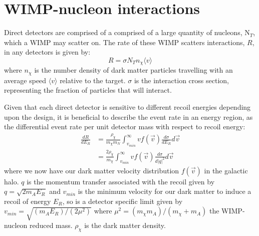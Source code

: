 \section{WIMP-nucleon interactions} \label{sec:wimp_nucleus_interactions}
\iffalse
\par
As WIMPs travel at relative non-relativistic speeds, the recoil energy of the nucleon resulting from an elastic scatter is by only the centre of mass scattering angle, $\theta$ \cite{direct_detection_of_wimps_ref}:
\begin{equation}
    E_{R} = \frac{{\mu}_{N}^{2}\nu_{\chi}^2}{m_{N}}(1-\cos(\theta))
\end{equation}
\fi
Direct detectors are comprised of a comprised of a large quantity of nucleons, N$_T$, which a WIMP may scatter on.
The rate of these WIMP scatters interactions, $R$, in any detectors is given by:
\begin{equation}
    R = \sigma N_{T} n_{\chi} \langle v \rangle
    \label{eq:wimp_nucleon_rate}
\end{equation}
where $n_\chi$ is the number density of dark matter particles travelling with an average speed $\langle v \rangle$ relative to the target.
$\sigma$ is the interaction cross section, representing the fraction of particles that will interact.
\par
Given that each direct detector is sensitive to different recoil energies depending upon the design, it is beneficial to describe the event rate in an energy region, as the differential event rate per unit detector mass with respect to recoil energy:
\begin{equation}
\begin{split}
    \frac{dR}{dE_R} &= \frac{\rho_{\chi}}{m_\chi m_N} \int^{\infty}_{v_{min}} v f(\vec{v}) \frac{d\sigma}{dE_R} d\vec{v} \\
                    &= \frac{2\rho_{\chi}}{m_\chi} \int^{\infty}_{v_{min}} v f(\vec{v}) \frac{d\sigma}{d |q|^2} d\vec{v}
\end{split}
\label{eq:wimp_differential_rate}
\end{equation}
where we now have our dark matter velocity distribution $f(\vec{v})$ in the galactic halo.
$q$ is the momentum transfer associated with the recoil given by $q = \sqrt{2m_A E_R}$ and $v_{min}$ is the minimum velocity for our dark matter to induce a recoil of energy $E_R$, so is a detector specific limit given by $v_{min} = \sqrt{(m_A E_R)/(2\mu^2)}$ where $\mu^2 = (m_\chi m_A)/(m_\chi + m_A)$ the WIMP-nucleon reduced mass.
$\rho_{\chi}$ is the dark matter density.
